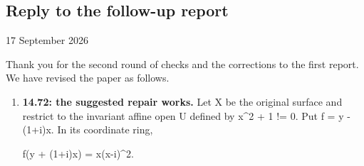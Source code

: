 \hypertarget{reply2-md-reply-to-the-follow-up-report}{%
\subsection*{Reply to the follow-up
report}\label{reply2-md-reply-to-the-follow-up-report}}

17 September 2026

Thank you for the second round of checks and the corrections to the
first report. We have revised the paper as follows.

\begin{enumerate}
\def\labelenumi{\arabic{enumi}.}
\item
  \textbf{14.72: the suggested repair works.} Let X be the original
  surface and restrict to the invariant affine open U defined by x\^{}2
  + 1 != 0. Put f = y - (1+i)x. In its coordinate ring,

  f(y + (1+i)x) = x(x-i)\^{}2.


\end{enumerate}
